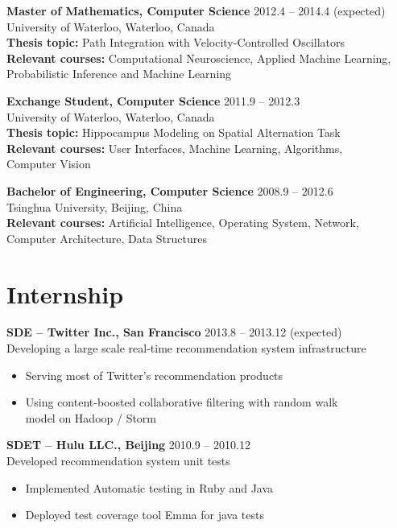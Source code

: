 \documentclass[margin]{res}
\begin{document}
\begin{resume}
 {\bf Master of Mathematics, Computer Science} \hfill 2012.4 -- 2014.4 (expected)\\
 University of Waterloo, Waterloo, Canada\\
 {\bf Thesis topic:} Path Integration with Velocity-Controlled Oscillators\\
 {\bf Relevant courses:} Computational Neuroscience,  Applied Machine Learning,\\
 Probabilistic Inference and Machine Learning
 
 {\bf Exchange Student, Computer Science} \hfill 2011.9 -- 2012.3\\
 University of Waterloo, Waterloo, Canada\\
 {\bf Thesis topic:} Hippocampus Modeling on Spatial Alternation Task\\
 {\bf Relevant courses:} User Interfaces, Machine Learning, Algorithms, \\
 Computer Vision
 
 {\bf Bachelor of Engineering, Computer Science} \hfill 2008.9 -- 2012.6\\
 Tsinghua University, Beijing, China\\
 {\bf Relevant courses:} Artificial Intelligence, Operating System, Network, \\
 Computer Architecture, Data Structures

 
 
 \section{Internship}

 {\bf SDE -- Twitter Inc., San Francisco} \hfill 2013.8 -- 2013.12 (expected)\\
 Developing a large scale real-time recommendation system infrastructure
  \begin{itemize} \itemsep -2pt
  \item Serving most of Twitter's recommendation products
  \item Using content-boosted collaborative filtering with random walk\\ model on Hadoop / Storm
  \end{itemize}

 {\bf SDET -- Hulu LLC., Beijing} \hfill 2010.9 -- 2010.12\\
 Developed recommendation system unit tests
  \begin{itemize} \itemsep -2pt
  \item Implemented Automatic testing in Ruby and Java
  \item Deployed test coverage tool Emma for java tests
  \end{itemize} 




\end{resume}
\end{document}

